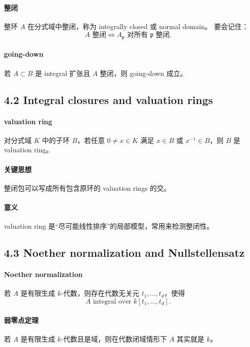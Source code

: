 \documentclass[a4paper]{ctexart}
\begin{document}
\paragraph{整闭}
整环 \(A\) 在分式域中整闭，称为 integrally closed 或 normal domain。
要会记住：
\[
A \text{ 整闭}
\Longleftrightarrow
A_{\mathfrak p} \text{ 对所有 } \mathfrak p \text{ 整闭}.
\]

\paragraph{going-down}
若 \(A\subset B\) 是 integral 扩张且 \(A\) 整闭，则 going-down 成立。

\subsection{4.2 Integral closures and valuation rings}

\paragraph{valuation ring}
对分式域 \(K\) 中的子环 \(B\)，若任意 \(0\neq x\in K\) 满足 \(x\in B\) 或 \(x^{-1}\in B\)，则 \(B\) 是 valuation ring。

\paragraph{关键思想}
整闭包可以写成所有包含原环的 valuation rings 的交。

\paragraph{意义}
valuation ring 是“尽可能线性排序”的局部模型，常用来检测整闭性。

\subsection{4.3 Noether normalization and Nullstellensatz}

\paragraph{Noether normalization}
若 \(A\) 是有限生成 \(k\)-代数，则存在代数无关元 \(t_1,\dots,t_d\)，使得
\[
A \text{ integral over } k[t_1,\dots,t_d].
\]

\paragraph{弱零点定理}
若 \(A\) 是有限生成 \(k\)-代数且是域，则在代数闭域情形下 \(A\) 其实就是 \(k\)。
\end{document}
